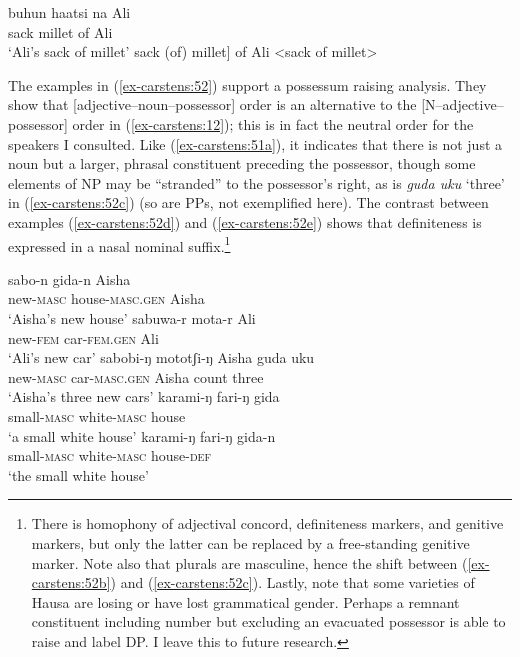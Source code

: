 \documentclass[output=paper
,modfonts
,nonflat]{langsci/langscibook}
\begin{document}
\begin{exe}
	\ex \label{ex-carstens:51}
	\xlist
	\ex \label{ex-carstens:51a}
	\gll buhun haatsi na Ali\\
	sack     millet  of Ali\\
	\glt `Ali's sack of millet'  	
	\ex {[}sack (of) millet{]} of Ali <sack of millet> \label{ex-carstens:51b}
	
	\endxlist
\end{exe}
The examples in (\ref{ex-carstens:52}) support a possessum raising analysis. They show that [ad\-jec\-tive--noun--possessor] order is an alternative to the [N--adjective--possessor] order in (\ref{ex-carstens:12}); this is in fact the neutral order for the speakers I consulted. Like (\ref{ex-carstens:51a}), it indicates that there is not just a noun but a larger, phrasal constituent preceding the possessor, though some elements of NP may be “stranded” to the possessor’s right, as is \textit{guda uku} ‘three’ in (\ref{ex-carstens:52c}) (so are PPs, not exemplified here). The contrast between examples (\ref{ex-carstens:52d}) and (\ref{ex-carstens:52e}) shows that definiteness is expressed in a nasal nominal suffix.\footnote{There is homophony of adjectival concord, definiteness markers, and genitive markers, but only the latter can be replaced by a free-standing genitive marker. Note also that plurals are masculine, hence the shift between (\ref{ex-carstens:52b}) and (\ref{ex-carstens:52c}). Lastly, note that some varieties of Hausa are losing or have lost grammatical gender. Perhaps a remnant constituent including number but excluding an evacuated possessor is able to raise and label DP. I leave this to future research.}
\begin{exe}
	\ex \label{ex-carstens:52}
	\xlist
	\ex \label{ex-carstens:52a}
	\gll sabo-n        gida-n           Aisha\\
	new-\textsc{masc}  house-\textsc{masc.gen} Aisha\\
	\glt `Aisha's new house'  	
	\ex \label{ex-carstens:52b}
	\gll sabuwa-r     mota-r       Ali\\
	new-\textsc{fem}     car-\textsc{fem.gen} Ali\\
	\glt `Ali's new car'
	\ex \label{ex-carstens:52c}
	\gll sabobi-ŋ     mototʃi-ŋ       Aisha   guda     uku\\
	new-\textsc{masc}  car-\textsc{masc.gen}    Aisha        count     three\\
	\glt `Aisha's three new cars'  	
	\ex \label{ex-carstens:52d}
	\gll karami-ŋ   fari-ŋ       gida\\
	small-\textsc{masc}  white-\textsc{masc}   house\\
	\glt `a small white house'	
	\ex \label{ex-carstens:52e}
	\gll karami-ŋ     fari-ŋ         gida-n\\
	small-\textsc{masc}     white-\textsc{masc}  house-\textsc{def}\\
	\glt `the small white house'	
	\endxlist
\end{exe}
\end{document}
